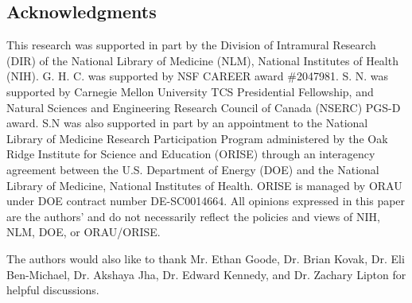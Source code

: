 \subsection*{Acknowledgments}
\label{ch03:sec:acknowledgments}
This research was supported in part by the Division of Intramural Research (DIR) of the National Library of Medicine (NLM), National Institutes of Health (NIH).
G. H. C. was supported by NSF CAREER award \#2047981.
S. N. was supported by Carnegie Mellon University TCS Presidential Fellowship, and Natural Sciences and Engineering Research Council of Canada (NSERC) PGS-D award.
S.N was also supported in part by an appointment to the National Library of Medicine Research Participation Program administered by the Oak Ridge Institute for Science and Education (ORISE) through an interagency agreement between the U.S. Department of Energy (DOE) and the National Library of Medicine, National Institutes of Health. 
ORISE is managed by ORAU under DOE contract number DE-SC0014664. 
All opinions expressed in this paper are the authors' and do not necessarily reflect the policies and views of NIH, NLM,
DOE, or ORAU/ORISE.

The authors would also like to thank Mr. Ethan Goode, Dr. Brian Kovak, Dr. Eli Ben-Michael, Dr. Akshaya Jha, Dr. Edward Kennedy, and Dr. Zachary Lipton for helpful discussions.

